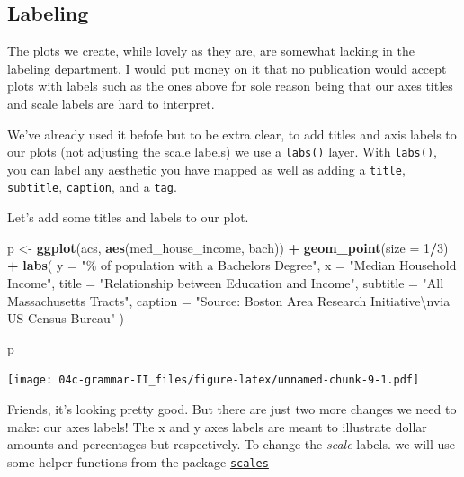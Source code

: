 \documentclass[
]{book}
\newenvironment{Shaded}{\begin{snugshade}}{\end{snugshade}}
\newcommand{\CharTok}[1]{\textcolor[rgb]{0.31,0.60,0.02}{#1}}
\newcommand{\DataTypeTok}[1]{\textcolor[rgb]{0.13,0.29,0.53}{#1}}
\newcommand{\DecValTok}[1]{\textcolor[rgb]{0.00,0.00,0.81}{#1}}
\newcommand{\KeywordTok}[1]{\textcolor[rgb]{0.13,0.29,0.53}{\textbf{#1}}}
\newcommand{\NormalTok}[1]{#1}
\newcommand{\OperatorTok}[1]{\textcolor[rgb]{0.81,0.36,0.00}{\textbf{#1}}}
\newcommand{\StringTok}[1]{\textcolor[rgb]{0.31,0.60,0.02}{#1}}
\begin{document}
\hypertarget{labeling}{%
\subsection{Labeling}\label{labeling}}

The plots we create, while lovely as they are, are somewhat lacking in the labeling department. I would put money on it that no publication would accept plots with labels such as the ones above for sole reason being that our axes titles and scale labels are hard to interpret.

We've already used it befofe but to be extra clear, to add titles and axis labels to our plots (not adjusting the scale labels) we use a \texttt{labs()} layer. With \texttt{labs()}, you can label any aesthetic you have mapped as well as adding a \texttt{title}, \texttt{subtitle}, \texttt{caption}, and a \texttt{tag}.

Let's add some titles and labels to our plot.

\begin{Shaded}
\begin{Highlighting}[]
\NormalTok{p \textless{}{-}}\StringTok{ }\KeywordTok{ggplot}\NormalTok{(acs, }\KeywordTok{aes}\NormalTok{(med\_house\_income, bach)) }\OperatorTok{+}
\StringTok{  }\KeywordTok{geom\_point}\NormalTok{(}\DataTypeTok{size =} \DecValTok{1}\OperatorTok{/}\DecValTok{3}\NormalTok{) }\OperatorTok{+}
\StringTok{    }\KeywordTok{labs}\NormalTok{(}
       \DataTypeTok{y =} \StringTok{"\% of population with a Bachelor\textquotesingle{}s Degree"}\NormalTok{,}
       \DataTypeTok{x =} \StringTok{"Median Household Income"}\NormalTok{,}
       \DataTypeTok{title =} \StringTok{"Relationship between Education and Income"}\NormalTok{,}
       \DataTypeTok{subtitle =} \StringTok{"All Massachusetts Tracts"}\NormalTok{,}
       \DataTypeTok{caption =} \StringTok{"Source: Boston Area Research Initiative}\CharTok{\textbackslash{}n}\StringTok{via US Census Bureau"}
\NormalTok{      )}

\NormalTok{p}
\end{Highlighting}
\end{Shaded}

\texttt{[image: 04c-grammar-II\_files/figure-latex/unnamed-chunk-9-1.pdf]}

Friends, it's looking pretty good. But there are just two more changes we need to make: our axes labels! The x and y axes labels are meant to illustrate dollar amounts and percentages but respectively. To change the \emph{scale} labels. we will use some helper functions from the package \href{https://scales.r-lib.org/}{\texttt{scales}}
\end{document}
